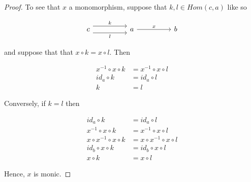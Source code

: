 \begin{Exercise}
\begin{proof}
        To see that $x$ a monomorphism, suppose that $k, l \in Hom(c,a)$ like so 

        \[\begin{tikzcd}
	       c && a && b
	       \arrow["l"', shift right=2, from=1-1, to=1-3]
	       \arrow["k", shift left=2, from=1-1, to=1-3]
	       \arrow["x", from=1-3, to=1-5]
        \end{tikzcd}\]
        
        and suppose that that $x\circ k = x \circ l $. Then 

        \begin{align*}
        x^{-1} \circ x\circ k &=  x^{-1} \circ x\circ l \\ 
        id_a \circ k &= id_a \circ l \\
        k &= l
        \end{align*} 

        Conversely, if $k = l$ then 

        \begin{align*}
        id_a \circ k & = id_a \circ l \\
        x^{-1} \circ x \circ k & = x^{-1} \circ x \circ l \\
        x \circ x^{-1} \circ x \circ k & = x\circ x^{-1} \circ x \circ l \\
        id_b \circ x \circ k & = id_b \circ x \circ l \\
        x \circ k & =  x \circ l
        \end{align*}

        Hence, $x$ is monic. 
    \end{proof}
\end{Exercise}